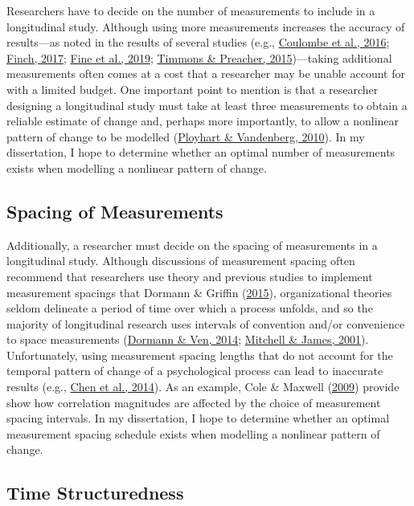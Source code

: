 \documentclass[
12pt, %
twoside,
english]{guelphthesis}
\begin{document}
Researchers have to decide on the number of measurements to include in a longitudinal study. Although using more measurements increases the accuracy of results---as noted in the results of several studies (e.g., \protect\hyperlink{ref-coulombe2016}{Coulombe et al., 2016}; \protect\hyperlink{ref-finch2017}{Finch, 2017}; \protect\hyperlink{ref-fine2019}{Fine et al., 2019}; \protect\hyperlink{ref-timmons2015}{Timmons \& Preacher, 2015})---taking additional measurements often comes at a cost that a researcher may be unable account for with a limited budget. One important point to mention is that a researcher designing a longitudinal study must take at least three measurements to obtain a reliable estimate of change and, perhaps more importantly, to allow a nonlinear pattern of change to be modelled (\protect\hyperlink{ref-ployhart2010}{Ployhart \& Vandenberg, 2010}). In my dissertation, I hope to determine whether an optimal number of measurements exists when modelling a nonlinear pattern of change.

\hypertarget{spacing-of-measurements}{%
\subsection{Spacing of Measurements}\label{spacing-of-measurements}}

Additionally, a researcher must decide on the spacing of measurements in a longitudinal study. Although discussions of measurement spacing often recommend that researchers use theory and previous studies to implement measurement spacings that Dormann \& Griffin (\protect\hyperlink{ref-dormann2015}{2015}), organizational theories seldom delineate a period of time over which a process unfolds, and so the majority of longitudinal research uses intervals of convention and/or convenience to space measurements (\protect\hyperlink{ref-dormann2014}{Dormann \& Ven, 2014}; \protect\hyperlink{ref-mitchell2001}{Mitchell \& James, 2001}). Unfortunately, using measurement spacing lengths that do not account for the temporal pattern of change of a psychological process can lead to inaccurate results (e.g., \protect\hyperlink{ref-chen2014}{Chen et al., 2014}). As an example, Cole \& Maxwell (\protect\hyperlink{ref-cole2009}{2009}) provide show how correlation magnitudes are affected by the choice of measurement spacing intervals. In my dissertation, I hope to determine whether an optimal measurement spacing schedule exists when modelling a nonlinear pattern of change.

\hypertarget{time-structuredness}{%
\subsection{Time Structuredness}\label{time-structuredness}}
\end{document}
